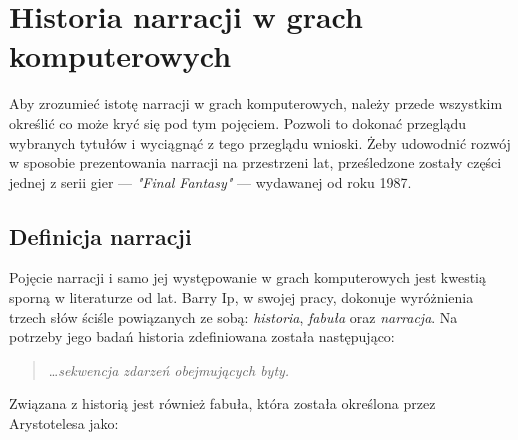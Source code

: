 \graphicspath{{chapters/chapter1/imgs/}}

\chapter{Historia narracji w grach komputerowych}\label{chapter:ch1}



Aby zrozumieć istotę narracji w grach komputerowych, należy przede wszystkim określić
co może kryć się pod tym pojęciem. Pozwoli to dokonać przeglądu wybranych tytułów
i wyciągnąć z tego przeglądu wnioski. Żeby udowodnić rozwój w sposobie prezentowania narracji
na przestrzeni lat, prześledzone zostały części jednej z serii gier --- \textit{"Final Fantasy"} ---
wydawanej od roku 1987.

\section{Definicja narracji}\label{subsection:ch1_1}

Pojęcie narracji i samo jej występowanie w grach komputerowych jest kwestią sporną
w literaturze od lat. Barry Ip, w swojej pracy\cite{narrative_structures}, dokonuje wyróżnienia trzech słów ściśle
powiązanych ze sobą: \textit{historia}, \textit{fabuła} oraz \textit{narracja}. Na potrzeby jego
badań historia zdefiniowana została następująco:

\begin{quotation}
    \ldots \textit{sekwencja zdarzeń obejmujących byty.}\cite{narrative_structures}
\end{quotation}

Związana z historią jest również fabuła, która została określona przez Arystotelesa jako:

